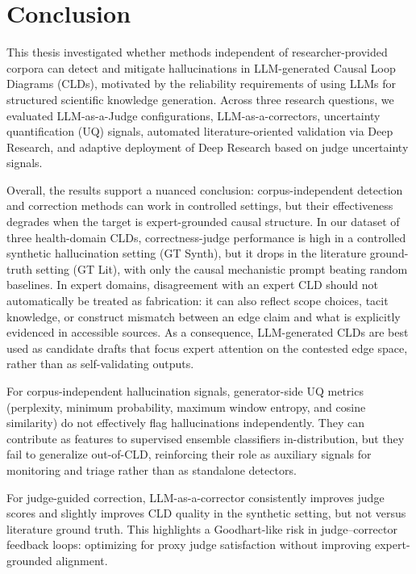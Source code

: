 \section{Conclusion}
\label{sec:conclusion}

This thesis investigated whether methods independent of researcher-provided corpora can detect and mitigate hallucinations in LLM-generated Causal Loop Diagrams (CLDs), motivated by the reliability requirements of using LLMs for structured scientific knowledge generation. Across three research questions, we evaluated LLM-as-a-Judge configurations, LLM-as-a-correctors, uncertainty quantification (UQ) signals, automated literature-oriented validation via Deep Research, and adaptive deployment of Deep Research based on judge uncertainty signals.

Overall, the results support a nuanced conclusion: corpus-independent detection and correction methods can work in controlled settings, but their effectiveness degrades when the target is expert-grounded causal structure. In our dataset of three health-domain CLDs, correctness-judge performance is high in a controlled synthetic hallucination setting (GT Synth), but it drops in the literature ground-truth setting (GT Lit), with only the causal mechanistic prompt beating random baselines. In expert domains, disagreement with an expert CLD should not automatically be treated as fabrication: it can also reflect scope choices, tacit knowledge, or construct mismatch between an edge claim and what is explicitly evidenced in accessible sources. As a consequence, LLM-generated CLDs are best used as candidate drafts that focus expert attention on the contested edge space, rather than as self-validating outputs.

For corpus-independent hallucination signals, generator-side UQ metrics (perplexity, minimum probability, maximum window entropy, and cosine similarity) do not effectively flag hallucinations independently. They can contribute as features to supervised ensemble classifiers in-distribution, but they fail to generalize out-of-CLD, reinforcing their role as auxiliary signals for monitoring and triage rather than as standalone detectors.

For judge-guided correction, LLM-as-a-corrector consistently improves judge scores and slightly improves CLD quality in the synthetic setting, but not versus literature ground truth. This highlights a Goodhart-like risk in judge--corrector feedback loops: optimizing for proxy judge satisfaction without improving expert-grounded alignment.

